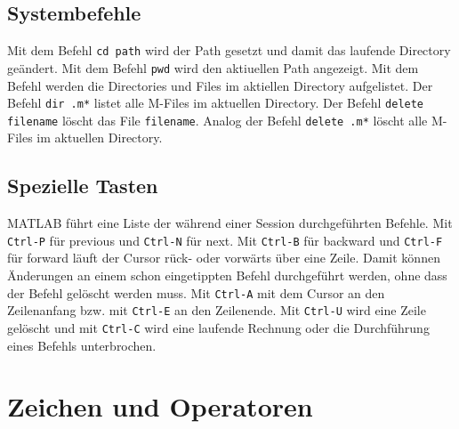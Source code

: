{\subsection{Systembefehle}
Mit dem Befehl {\color{red}\texttt{cd path}} wird der Path gesetzt und damit das laufende Directory geändert. Mit dem Befehl {\color{red}\texttt{pwd}} wird den aktiuellen Path angezeigt.
\newline\newline
Mit dem Befehl  werden die Directories und Files im aktiellen Directory aufgelistet. Der Befehl {\color{red}\texttt{dir .m*}} listet alle M-Files im aktuellen Directory. Der Befehl {\color{red}\texttt{delete filename}} löscht das File \texttt{filename}. Analog der Befehl {\color{red}\texttt{delete .m*}} löscht alle M-Files im aktuellen Directory.
\subsection{Spezielle Tasten}
MATLAB führt eine Liste der während einer Session durchgeführten Befehle. Mit {\color{red}\texttt{Ctrl-P}} für previous und {\color{red}\texttt{Ctrl-N}} für next. Mit {\color{red}\texttt{Ctrl-B}} für backward und {\color{red}\texttt{Ctrl-F}} für forward läuft der Cursor rück- oder vorwärts über eine Zeile. Damit können Änderungen an einem schon eingetippten Befehl durchgeführt werden, ohne dass der Befehl gelöscht werden muss. Mit {\color{red}\texttt{Ctrl-A}} mit dem Cursor an den Zeilenanfang bzw. mit {\color{red}\texttt{Ctrl-E}} an den Zeilenende. Mit {\color{red}\texttt{Ctrl-U}} wird eine Zeile gelöscht und mit {\color{red}\texttt{Ctrl-C}} wird eine laufende Rechnung oder die Durchführung eines Befehls unterbrochen.
\section{Zeichen und Operatoren}
}
